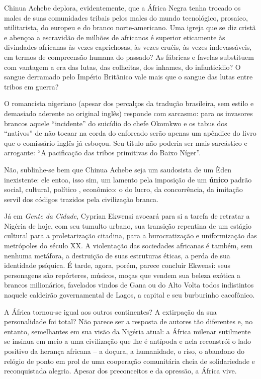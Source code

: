 \documentclass[
  letterpaper,
  DIV=11,
  numbers=noendperiod]{scrreprt}
\begin{document}
Chinua Achebe deplora, evidentemente, que a África Negra tenha trocado
os males de suas comunidades tribais pelos males do mundo tecnológico,
prosaico, utilitarista, do europeu e do branco norte-americano. Uma
igreja que se diz cristã e abençoa a escravidão de milhões de africanos
é superior eticamente às divindades africanas às vezes caprichosas, às
vezes cruéis, às vezes indevassáveis, em termos de compreensão humana do
passado? As fábricas e favelas substituem com vantagem a era das lutas,
das colheitas, dos inhames, do infanticídio? O sangue derramado pelo
Império Britânico vale mais que o sangue das lutas entre tribos em
guerra?

O romancista nigeriano (apesar dos percalços da tradução brasileira, sem
estilo e demasiado aderente ao original inglês) responde com sarcasmo:
para os invasores brancos aquele ``incidente'' do suicídio do chefe
Okomkwo e os tabus dos ``nativos'' de não tocaar na corda do enforcado
serão apenas um apêndice do livro que o comissário inglês já esboçou.
Seu título não poderia ser mais sarcástico e arrogante: ``A pacificação
das tribos primitivas do Baixo Níger''.

Não, sublinhe-se bem que Chinua Achebe seja um saudosista de um Èden
inexistente: ele entoa, isso sim, um lamento pela imposição de um
\textbf{único} padrão social, cultural, político , econômico: o do
lucro, da concorrência, da imitação servil dos códigos trazidos pela
civilização branca.

Já em \emph{Gente da Cidade}, Cyprian Ekwensi avocará para si a tarefa
de retratar a Nigéria de hoje, com seu tumulto urbano, sua transição
repentina de um estágio cultural para a proletarização citadina, para a
burocratização e uniformização das metrópoles do século XX. A
violentação das sociedades africanas é também, sem nenhuma metáfora, a
destruição de suas estruturas éticas, a perda de sua identidade
psíquica. É tarde, agora, porém, parece concluir Ekwensi: seus
personagens são repórteres, músicos, moças que vendem sua beleza exótica
a brancos milionários, favelados vindos de Gana ou do Alto Volta todos
indistintos naquele caldeirão governamental de Lagos, a capital e seu
burburinho cacofônico.

A África tornou-se igual aos outros continentes? A extirpação da sua
personalidade foi total? Não parece ser a resposta de autores tão
diferentes e, no entanto, semelhantes em sua visão da Nigéria atual: a
África milenar sutilmente se insinua em meio a uma civilização que lhe é
antípoda e nela reconstrói o lado positivo da herança africana -- a
doçura, a humanidade, o riso, o abandono do relógio de ponto em prol de
uma cooperação comunitária cheia de solidariedade e reconquistada
alegria. Apesar dos preconceitos e da opressão, a África vive.
\end{document}
